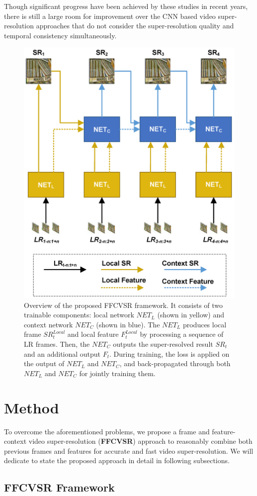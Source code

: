 \documentclass[letterpaper]{article} %
\begin{document}
Though significant progress have been achieved by these studies in recent years, there is still a large room for improvement over the CNN based video super-resolution approaches that do not consider the super-resolution quality and temporal consistency simultaneously.


\begin{figure}[t]
\centering
\includegraphics[width=7 cm]{Fig3.png}
\caption{Overview of the proposed FFCVSR framework. It consists of two trainable components: local network $NET_L$ (shown in yellow) and context network $NET_C$ (shown in blue). The $NET_L$ produces local frame $SR^{Local}_t$ and local feature $F^{Local}_t$ by processing a sequence of LR frames. Then, the $NET_C$ outputs the super-resolved result $SR_t$ and an additional output $F_t$. During training, the loss is applied on the output of $NET_L$ and $NET_C$, and back-propagated through both $NET_L$ and $NET_C$ for jointly training them.}
\label{proposedFramwork}
\end{figure}





\section{Method}


To overcome the aforementioned problems, we propose a frame and feature-context video super-resolution (\textbf{FFCVSR}) approach to reasonably combine both previous frames and features for accurate and fast video super-resolution. We will dedicate to state the proposed approach in detail in following subsections.


\subsection{FFCVSR Framework}
\end{document}

